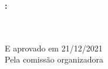 \begin{folhadeaprovacao}

    \begin{center}
      {\ABNTEXchapterfont\large\MakeUppercase{\imprimirautor}}
  
      \vspace*{\fill}\vspace*{\fill}
      \begin{center}
        \ABNTEXchapterfont\bfseries\large\MakeUppercase{\imprimirtitulo}\normalfont\MakeUppercase{:
        \imprimirsubtitulo}	
      \end{center}
      \vspace*{\fill}
      
      \hfill
      \begin{minipage}{.7\textwidth}
          \imprimirpreambulo \\ \\
          E aprovado em 21/12/2021 \\
          Pela comissão organizadora
      \end{minipage}%
      \vspace*{\fill}
     \end{center}
  
\end{folhadeaprovacao}

% 
